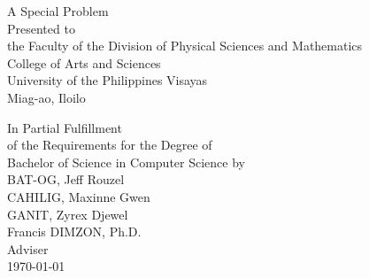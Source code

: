 \begin{titlepage}
\centering


\vspace{0.875cm}
A Special Problem\\
Presented to\\
the Faculty of the Division of Physical Sciences and Mathematics\\
College of Arts and Sciences\\
University of the Philippines Visayas\\
Miag-ao, Iloilo

\vspace{0.875cm}
In Partial Fulfillment\\
of the Requirements for the Degree of\\
Bachelor of Science in Computer Science
\vspace{1.75cm}
by\\

\vspace{0.1cm}
BAT-OG, Jeff Rouzel  \\
CAHILIG, Maxinne Gwen  \\
GANIT, Zyrex Djewel  \\

\vspace{0.875cm}
Francis DIMZON, Ph.D. \\
Adviser\\


\vspace{0.875cm}
\today
\end{titlepage}
